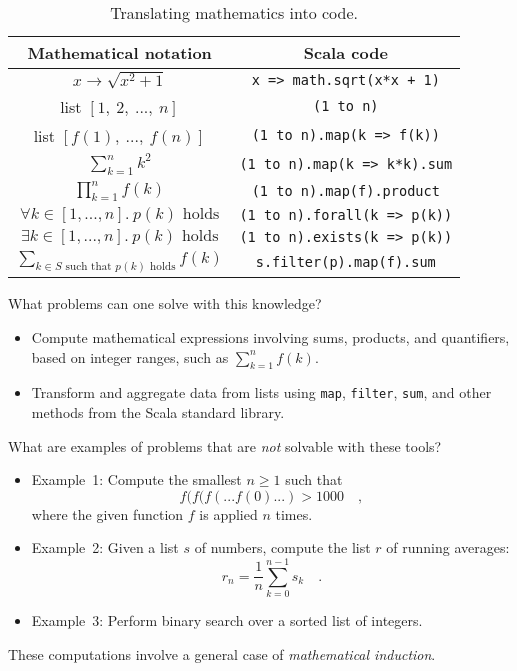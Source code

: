 \begin{table}
\begin{centering}
\begin{tabular}{|c|c|}
\hline 
\textbf{Mathematical notation} & \textbf{Scala code}\tabularnewline
\hline 
\hline 
$x\rightarrow\sqrt{x^{2}+1}$ & \lstinline!x => math.sqrt(x*x + 1)!\tabularnewline
\hline 
list $\left[1,~2,~...,~n\right]$ & \lstinline!(1 to n)!\tabularnewline
\hline 
list $\left[f(1),~...,~f(n)\right]$ & \lstinline!(1 to n).map(k => f(k))!\tabularnewline
\hline 
$\sum_{k=1}^{n}k^{2}$ & \lstinline!(1 to n).map(k => k*k).sum!\tabularnewline
\hline 
$\prod_{k=1}^{n}f(k)$ & \lstinline!(1 to n).map(f).product!\tabularnewline
\hline 
$\forall k\in[1,...,n].~p(k)\text{ holds}$ & \lstinline!(1 to n).forall(k => p(k))!\tabularnewline
\hline 
$\exists k\in[1,...,n].\:p(k)\text{ holds}$ & \lstinline!(1 to n).exists(k => p(k))!\tabularnewline
\hline 
${\displaystyle \sum_{k\in S\text{ such that }p(k)\text{ holds}}}f(k)$ & \lstinline!s.filter(p).map(f).sum!\tabularnewline
\hline 
\end{tabular}
\par\end{centering}
\caption{Translating mathematics into code.\label{tab:translating-mathematics-into-code}}
\end{table}

What problems can one solve with this knowledge?
\begin{itemize}
\item Compute mathematical expressions involving sums, products, and quantifiers,
based on integer ranges, such as $\sum_{k=1}^{n}f(k)$.
\item Transform and aggregate data from lists using \lstinline!map!, \lstinline!filter!,\textbf{
}\lstinline!sum!, and other methods from the Scala standard library.
\end{itemize}
What are examples of problems that are \emph{not} solvable with these
tools?
\begin{itemize}
\item Example~1: Compute the smallest $n\geq1$ such that 
\[
f(f(f(...f(0)...)>1000\quad,
\]
where the given function $f$ is applied $n$ times.
\item Example~2: Given a list $s$ of numbers, compute the list $r$ of
running averages: 
\[
r_{n}=\frac{1}{n}\sum_{k=0}^{n-1}s_{k}\quad.
\]
\item Example~3: Perform binary search over a sorted list of integers.
\end{itemize}
These computations involve a general case of \emph{mathematical induction}. 


